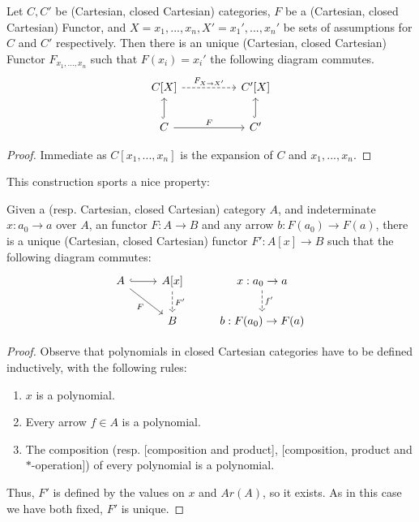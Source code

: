 \begin{proposition}\label{unique-polynomial-functor}Let $C,C'$ be (Cartesian, closed Cartesian) categories, $F$ be a (Cartesian, closed Cartesian) Functor, and $X={x_1,...,x_n}, X'={x_1',...,x_n'}$ be sets of assumptions for $C$ and $C'$ respectively. Then there is an unique (Cartesian, closed Cartesian) Functor $F_{x_1,...,x_n}$ such that $F(x_i)=x_i'$ the following diagram commutes. 
  \[
    \begin{tikzcd}
      C[X]\arrow[dashed]{rr}{F_{X\to X'}}&& C'[X]\\
      C \arrow{rr}{F}\arrow[hookrightarrow]{u}{}&& C'\arrow[hookrightarrow]{u}{}
    \end{tikzcd}
  \]
\end{proposition}
\begin{proof}
  Immediate as $C[x_1,...,x_n]$ is the expansion of $C$ and ${x_1,...,x_n}$.
\end{proof}

This construction sports a nice property:

\begin{proposition}\label{univ-polynomial}
  Given a (resp. Cartesian, closed Cartesian) category $A$, and indeterminate $x:a_0\to a$ over $A$, an functor $F:A\to B$ and any arrow $ b:F(a_0) \to F(a)$, there is a unique (Cartesian, closed Cartesian) functor $F': A[x]\to B$ such that the following diagram commutes:
  \[
    \begin{tikzcd}
      A\arrow[hookrightarrow]{r}{} \arrow[rd, "F", swap]      & A[x] \arrow[d, "F'", dashed]& x:a_0\to a\arrow[d,"f'",dashed]\\
      &B& b:F(a_0)\to F(a) 
    \end{tikzcd}
  \]
\end{proposition}
\begin{proof}
  Observe that polynomials in closed Cartesian categories have to be defined inductively, with the following rules:
  \begin{enumerate}
  \item $x$ is a polynomial.
  \item Every arrow $f\in A$ is a polynomial.
  \item The composition (resp.  [composition and product],  [composition, product and $*$-operation]) of every polynomial is a polynomial.
  \end{enumerate}
  Thus, $F'$ is defined by the values on $x$ and $Ar(A)$, so it exists. As in this case we have both fixed, $F'$ is unique. 
\end{proof}


